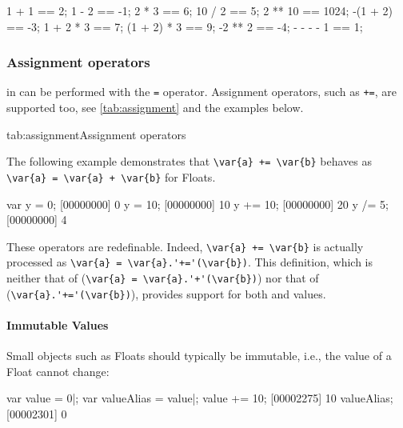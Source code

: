 \begin{urbiassert}
       1 + 1 ==    2;
       1 - 2 ==   -1;
       2 * 3 ==    6;
      10 / 2 ==    5;
     2 ** 10 == 1024;
    -(1 + 2) ==   -3;
   1 + 2 * 3 ==    7;
 (1 + 2) * 3 ==    9;
     -2 ** 2 ==   -4;
   - - - - 1 ==    1;
\end{urbiassert}

\subsubsection{Assignment operators}
\label{sec:lang:iass}
 in \us can be performed with the \lstinline|=| operator.
Assignment operators, such as \lstinline|+=|, are supported too, see
\autoref{tab:assignment} and the examples below.


\begin{operatorTable}{tab:assignment}{Assignment operators}
  \operatorass[\footnotemark]\\
  \operatorsiass
\end{operatorTable}


The following example demonstrates that \lstinline|\var{a} += \var{b}|
behaves as \lstinline|\var{a} = \var{a} + \var{b}| for Floats.
\begin{urbiscript}
var y = 0;
[00000000] 0
y = 10;
[00000000] 10
y += 10;
[00000000] 20
y /= 5;
[00000000] 4
\end{urbiscript}

These operators are redefinable.  Indeed, \lstinline|\var{a} += \var{b}| is
actually processed as \lstinline|\var{a} = \var{a}.'+='(\var{b})|.  This
definition, which is neither that of \C
(\lstinline|\var{a} = \var{a}.'+'(\var{b})|) nor that of \Cxx
(\lstinline|\var{a}.'+='(\var{b})|), provides support for both
 and  values.

\paragraph{Immutable Values}
Small objects such as Floats should typically be immutable, i.e., the value
of a Float cannot change:

\begin{urbiscript}
var value = 0|;
var valueAlias = value|;
value += 10;
[00002275] 10
valueAlias;
[00002301] 0
\end{urbiscript}

